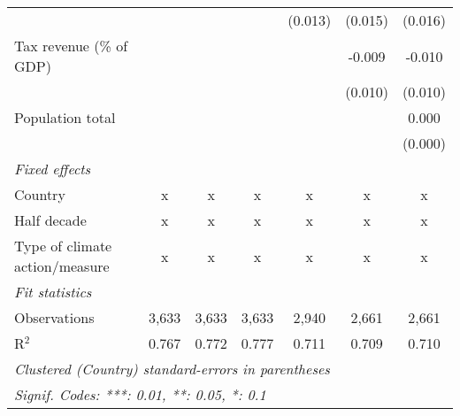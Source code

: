 \begin{tabular}{lcccccc}
                                                        &         &               &               & (0.013)        & (0.015)       & (0.016)\\   
   Tax revenue (\% of GDP)                              &         &               &               &                & -0.009        & -0.010\\   
                                                        &         &               &               &                & (0.010)       & (0.010)\\   
   Population total                                     &         &               &               &                &               & 0.000\\   
                                                        &         &               &               &                &               & (0.000)\\   
   \emph{Fixed effects}\\
   Country                                              & x       & x             & x             & x              & x             & x\\  
   Half decade                                          & x       & x             & x             & x              & x             & x\\  
   Type of climate action/measure                       & x       & x             & x             & x              & x             & x\\  
   \midrule \emph{Fit statistics}\\
   Observations                                         & 3,633   & 3,633         & 3,633         & 2,940          & 2,661         & 2,661\\  
   R$^2$                                                & 0.767   & 0.772         & 0.777         & 0.711          & 0.709         & 0.710\\  
   \midrule
   \multicolumn{7}{l}{\emph{Clustered (Country) standard-errors in parentheses}}\\
   \multicolumn{7}{l}{\emph{Signif. Codes: ***: 0.01, **: 0.05, *: 0.1}}\\
\end{tabular}
\par\endgroup


